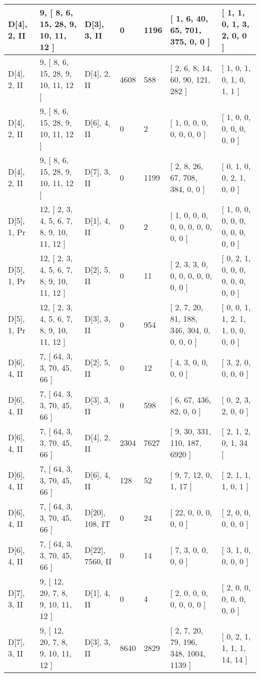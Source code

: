 \documentclass[9 pt]{scrartcl}
\begin{document}
\begin{longtable}{ |p{3em}|p{6em}|p{3em}|p{2em}|p{2em}|p{6em}|p{6em}| }
D[4], 2, II &9, [ 8, 6, 15, 28, 9, 10, 11, 12 ] & D[3], 3, II  & 0 & 1196 & [ 1, 6, 40, 65, 701, 375, 0, 0 ] & [ 1, 1, 0, 1, 3, 2, 0, 0 ]\\ \hline
D[4], 2, II &9, [ 8, 6, 15, 28, 9, 10, 11, 12 ] & D[4], 2, II  & 4608 & 588 & [ 2, 6, 8, 14, 60, 90, 121, 282 ] & [ 1, 0, 1, 0, 1, 0, 1, 1 ]\\ \hline
D[4], 2, II &9, [ 8, 6, 15, 28, 9, 10, 11, 12 ] & D[6], 4, II  & 0 & 2 & [ 1, 0, 0, 0, 0, 0, 0, 0 ] & [ 1, 0, 0, 0, 0, 0, 0, 0 ]\\ \hline
D[4], 2, II &9, [ 8, 6, 15, 28, 9, 10, 11, 12 ] & D[7], 3, II  & 0 & 1199 & [ 2, 8, 26, 67, 708, 384, 0, 0 ] & [ 0, 1, 0, 0, 2, 1, 0, 0 ]\\ \hline
D[5], 1, Pr &12, [ 2, 3, 4, 5, 6, 7, 8, 9, 10, 11, 12 ] & D[1], 4, II  & 0 & 2 & [ 1, 0, 0, 0, 0, 0, 0, 0, 0, 0, 0 ] & [ 1, 0, 0, 0, 0, 0, 0, 0, 0, 0, 0 ]\\ \hline
D[5], 1, Pr &12, [ 2, 3, 4, 5, 6, 7, 8, 9, 10, 11, 12 ] & D[2], 5, II  & 0 & 11 & [ 2, 3, 3, 0, 0, 0, 0, 0, 0, 0, 0 ] & [ 0, 2, 1, 0, 0, 0, 0, 0, 0, 0, 0 ]\\ \hline
D[5], 1, Pr &12, [ 2, 3, 4, 5, 6, 7, 8, 9, 10, 11, 12 ] & D[3], 3, II  & 0 & 954 & [ 2, 7, 20, 81, 188, 346, 304, 0, 0, 0, 0 ] & [ 0, 0, 1, 1, 2, 1, 1, 0, 0, 0, 0 ]\\ \hline
D[6], 4, II &7, [ 64, 3, 3, 70, 45, 66 ] & D[2], 5, II  & 0 & 12 & [ 4, 3, 0, 0, 0, 0 ] & [ 3, 2, 0, 0, 0, 0 ]\\ \hline
D[6], 4, II &7, [ 64, 3, 3, 70, 45, 66 ] & D[3], 3, II  & 0 & 598 & [ 6, 67, 436, 82, 0, 0 ] & [ 0, 2, 3, 2, 0, 0 ]\\ \hline
D[6], 4, II &7, [ 64, 3, 3, 70, 45, 66 ] & D[4], 2, II  & 2304 & 7627 & [ 9, 30, 331, 110, 187, 6920 ] & [ 2, 1, 2, 0, 1, 34 ]\\ \hline
D[6], 4, II &7, [ 64, 3, 3, 70, 45, 66 ] & D[6], 4, II  & 128 & 52 & [ 9, 7, 12, 0, 1, 17 ] & [ 2, 1, 1, 1, 0, 1 ]\\ \hline
D[6], 4, II &7, [ 64, 3, 3, 70, 45, 66 ] & D[20], 108, IT  & 0 & 24 & [ 22, 0, 0, 0, 0, 0 ] & [ 2, 0, 0, 0, 0, 0 ]\\ \hline
D[6], 4, II &7, [ 64, 3, 3, 70, 45, 66 ] & D[22], 7560, II  & 0 & 14 & [ 7, 3, 0, 0, 0, 0 ] & [ 3, 1, 0, 0, 0, 0 ]\\ \hline
D[7], 3, II &9, [ 12, 20, 7, 8, 9, 10, 11, 12 ] & D[1], 4, II  & 0 & 4 & [ 2, 0, 0, 0, 0, 0, 0, 0 ] & [ 2, 0, 0, 0, 0, 0, 0, 0 ]\\ \hline
D[7], 3, II &9, [ 12, 20, 7, 8, 9, 10, 11, 12 ] & D[3], 3, II  & 8640 & 2829 & [ 2, 7, 20, 79, 196, 348, 1004, 1139 ] & [ 0, 2, 1, 1, 1, 1, 14, 14 ]\\ \hline

\end{longtable}
\end{document}
